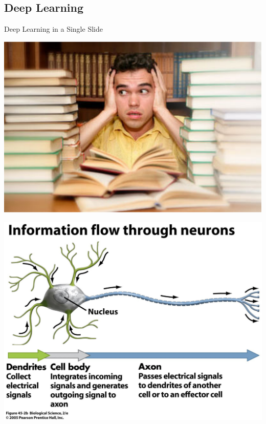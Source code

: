 \documentclass{beamer}
\begin{document}
\subsection{Deep Learning}

\begin{frame}{Deep Learning in a Single Slide}

    \vfill

     \centering
     \begin{minipage}{0.32\textwidth}
         \centering
         \includegraphics[width=0.9\columnwidth]{studying.pdf}
     \end{minipage}
     \hfill
     \begin{minipage}{0.32\textwidth}
         \centering
         \includegraphics[width=0.9\columnwidth]{neuron.pdf}
     \end{minipage}
     \hfill
     \begin{minipage}{0.32\textwidth}
         \centering

\end{minipage}
\end{frame}
\end{document}
